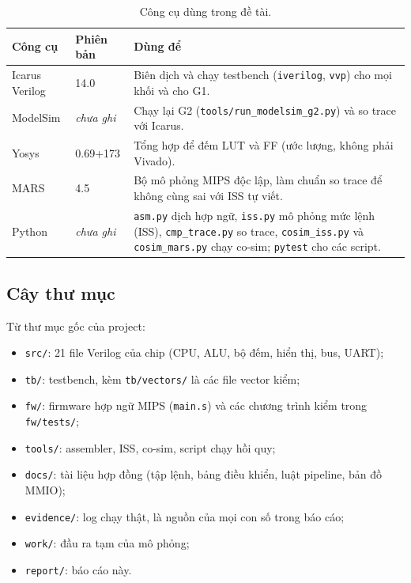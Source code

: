 \begin{table}[htbp]
\centering\small
\begin{tabular}{@{}l l p{7.2cm}@{}}
\toprule
Công cụ & Phiên bản & Dùng để \\
\midrule
Icarus Verilog & 14.0 & Biên dịch và chạy testbench (\texttt{iverilog}, \texttt{vvp}) cho mọi khối và cho G1. \\
ModelSim & \textit{chưa ghi} & Chạy lại G2 (\texttt{tools/run\_modelsim\_g2.py}) và so trace với Icarus. \\
Yosys & 0.69+173 & Tổng hợp để đếm LUT và FF (ước lượng, không phải Vivado). \\
MARS & 4.5 & Bộ mô phỏng MIPS độc lập, làm chuẩn so trace để không cùng sai với ISS tự viết. \\
Python & \textit{chưa ghi} & \texttt{asm.py} dịch hợp ngữ, \texttt{iss.py} mô phỏng mức lệnh (ISS), \texttt{cmp\_trace.py} so trace, \texttt{cosim\_iss.py} và \texttt{cosim\_mars.py} chạy co-sim; \texttt{pytest} cho các script. \\
\bottomrule
\end{tabular}
\caption{Công cụ dùng trong đề tài.}\label{tab:cong-cu}
\end{table}

\subsection{Cây thư mục}
Từ thư mục gốc của project:
\begin{itemize}
  \item \texttt{src/}: 21 file Verilog của chip (CPU, ALU, bộ đếm, hiển thị, bus, UART);
  \item \texttt{tb/}: testbench, kèm \texttt{tb/vectors/} là các file vector kiểm;
  \item \texttt{fw/}: firmware hợp ngữ MIPS (\texttt{main.s}) và các chương trình kiểm trong \texttt{fw/tests/};
  \item \texttt{tools/}: assembler, ISS, co-sim, script chạy hồi quy;
  \item \texttt{docs/}: tài liệu hợp đồng (tập lệnh, bảng điều khiển, luật pipeline, bản đồ MMIO);
  \item \texttt{evidence/}: log chạy thật, là nguồn của mọi con số trong báo cáo;
  \item \texttt{work/}: đầu ra tạm của mô phỏng;
  \item \texttt{report/}: báo cáo này.
\end{itemize}


